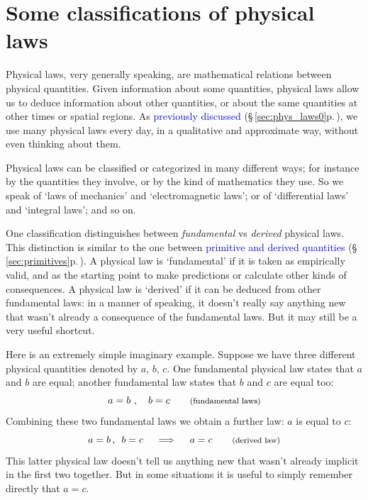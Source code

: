\documentclass[a4paper,12pt,%
onecolumn,oneside,%
british%
]{memoir}
\renewcommand*{\|}[1][]{\nonscript\:#1\vert\nonscript\:\mathopen{}}
\newcommand*{\sect}{\S}%
\renewcommand*{\autoref}[3][\sect\,\ref]{\textcolor{blue}{#3} {\color{blue}\scriptsize(\faIcon[regular]{eye}\;#1{#2}\;p.\,\pageref{#2})}}
\begin{document}
\section{Some classifications of physical laws}
\label{sec:fundamental_derived}

Physical laws, very generally speaking, are mathematical relations between physical quantities. Given information about some quantities, physical laws allow us to deduce information about other quantities, or about the same quantities at other times or spatial regions. As \autoref{sec:phys_laws0}{previously discussed}, we use many physical laws every day, in a qualitative and approximate way, without even thinking about them.

Physical laws can be classified or categorized in many different ways; for instance by the quantities they involve, or by the kind of mathematics they use. So we speak of \enquote*{laws of mechanics} and \enquote*{electromagnetic laws}; or of \enquote*{differential laws} and \enquote*{integral laws}; and so on.

\medskip

One classification distinguishes between \emph{fundamental} vs \emph{derived} physical laws. This distinction is similar to the one between \autoref{sec:primitives}{primitive and derived quantities}. A physical law is \enquote*{fundamental} if it is taken as empirically valid, and as the starting point to make predictions or calculate other kinds of consequences. A physical law is \enquote*{derived} if it can be deduced from other fundamental laws: in a manner of speaking, it doesn't really say anything new that wasn't already a consequence of the fundamental laws. But it may still be a very useful shortcut.

Here is an extremely simple imaginary example. Suppose we have three different physical quantities denoted by $a$, $b$, $c$. One fundamental physical law states that $a$ and $b$ are equal; another fundamental law states that $b$ and $c$ are equal too:
\begin{equation*}
  a=b \ , \quad b=c \qquad\text{\footnotesize(fundamental laws)}
\end{equation*}
Combining these two fundamental laws we obtain a further law: $a$ is equal to $c$:
\begin{equation*}
  a=b\,,\enskip b=c \quad\implies\quad a=c\qquad\text{\footnotesize(derived law)}
\end{equation*}
This latter physical law doesn't tell us anything new that wasn't already implicit in the first two together. But in some situations it is useful to simply remember directly that $a=c$.
\end{document}
